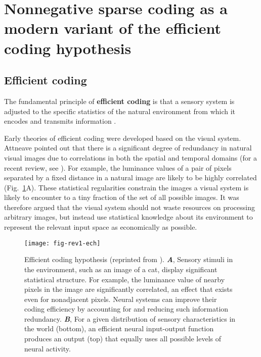 \section*{Nonnegative sparse coding as a modern variant of the efficient coding hypothesis}

\subsection*{Efficient coding}

The fundamental principle of \textbf{efficient coding}
is that a sensory system is
adjusted to the specific statistics of the natural environment from which
it encodes and transmits information
\cite{Barlow1961,Attneave1954,Linsker1990,LouieGlimcher2012}.

Early theories of efficient coding
\cite{Barlow1961,Attneave1954}
were developed based on the visual system.
Attneave \cite{Attneave1954} pointed out that there is a significant
degree of redundancy in natural visual images due to correlations in both
the spatial and temporal domains
(for a recent review, see \cite{SimoncelliOlshausen2001}).
For example, the luminance values of a pair of pixels
separated by a fixed distance in a natural image
are likely to be highly correlated
(Fig.~\ref{fig:ech}A).
These statistical regularities constrain the images a visual system
is likely to encounter to a tiny fraction of the set of all
possible images.
It was therefore argued that the visual system should not
waste resources on processing arbitrary images,
but instead use statistical knowledge
about its environment to represent the relevant input space 
as economically as possible.


\begin{figure}[h]
	\centering
	\texttt{[image: fig-rev1-ech]}
    \caption{Efficient coding hypothesis
    	 (reprinted from \cite{LouieGlimcher2012}).
    \textbf{\emph{A}},
         Sensory stimuli in the environment, such as an image of a cat,
         display significant statistical structure. For example, the luminance
         value of nearby pixels in the image are significantly correlated,
         an effect that exists even for nonadjacent pixels.
         Neural systems can improve their coding efficiency by accounting
         for and reducing such information redundancy.
     \textbf{\emph{B}},
         For a given distribution of sensory characteristics in the world (bottom),
         an efficient neural input-output function produces an output (top)
         that equally uses all possible levels of neural activity.
    }
	\label{fig:ech}
\end{figure}



